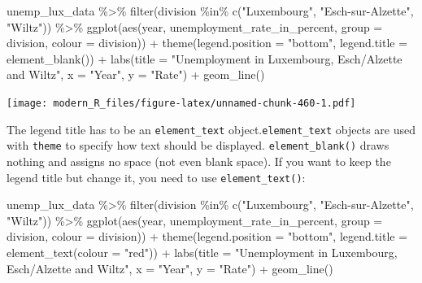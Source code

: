 \documentclass[
]{article}
\newenvironment{Shaded}{\begin{snugshade}}{\end{snugshade}}
\newcommand{\AttributeTok}[1]{\textcolor[rgb]{0.77,0.63,0.00}{#1}}
\newcommand{\FunctionTok}[1]{\textcolor[rgb]{0.00,0.00,0.00}{#1}}
\newcommand{\NormalTok}[1]{#1}
\newcommand{\SpecialCharTok}[1]{\textcolor[rgb]{0.00,0.00,0.00}{#1}}
\newcommand{\StringTok}[1]{\textcolor[rgb]{0.31,0.60,0.02}{#1}}
\begin{document}
\begin{Shaded}
\begin{Highlighting}[]
\NormalTok{unemp\_lux\_data }\SpecialCharTok{\%\textgreater{}\%}
  \FunctionTok{filter}\NormalTok{(division }\SpecialCharTok{\%in\%} \FunctionTok{c}\NormalTok{(}\StringTok{"Luxembourg"}\NormalTok{, }\StringTok{"Esch{-}sur{-}Alzette"}\NormalTok{, }\StringTok{"Wiltz"}\NormalTok{)) }\SpecialCharTok{\%\textgreater{}\%}
  \FunctionTok{ggplot}\NormalTok{(}\FunctionTok{aes}\NormalTok{(year, unemployment\_rate\_in\_percent, }\AttributeTok{group =}\NormalTok{ division, }\AttributeTok{colour =}\NormalTok{ division)) }\SpecialCharTok{+}
  \FunctionTok{theme}\NormalTok{(}\AttributeTok{legend.position =} \StringTok{"bottom"}\NormalTok{, }\AttributeTok{legend.title =} \FunctionTok{element\_blank}\NormalTok{()) }\SpecialCharTok{+}
  \FunctionTok{labs}\NormalTok{(}\AttributeTok{title =} \StringTok{"Unemployment in Luxembourg, Esch/Alzette and Wiltz"}\NormalTok{, }\AttributeTok{x =} \StringTok{"Year"}\NormalTok{, }\AttributeTok{y =} \StringTok{"Rate"}\NormalTok{) }\SpecialCharTok{+}
  \FunctionTok{geom\_line}\NormalTok{()}
\end{Highlighting}
\end{Shaded}

\texttt{[image: modern\_R\_files/figure-latex/unnamed-chunk-460-1.pdf]}

The legend title has to be an \texttt{element\_text} object.\texttt{element\_text} objects are used with \texttt{theme} to
specify how text should be displayed. \texttt{element\_blank()} draws nothing and assigns no space (not
even blank space). If you want to keep the legend title but change it, you need to use \texttt{element\_text()}:

\begin{Shaded}
\begin{Highlighting}[]
\NormalTok{unemp\_lux\_data }\SpecialCharTok{\%\textgreater{}\%}
  \FunctionTok{filter}\NormalTok{(division }\SpecialCharTok{\%in\%} \FunctionTok{c}\NormalTok{(}\StringTok{"Luxembourg"}\NormalTok{, }\StringTok{"Esch{-}sur{-}Alzette"}\NormalTok{, }\StringTok{"Wiltz"}\NormalTok{)) }\SpecialCharTok{\%\textgreater{}\%}
  \FunctionTok{ggplot}\NormalTok{(}\FunctionTok{aes}\NormalTok{(year, unemployment\_rate\_in\_percent, }\AttributeTok{group =}\NormalTok{ division, }\AttributeTok{colour =}\NormalTok{ division)) }\SpecialCharTok{+}
  \FunctionTok{theme}\NormalTok{(}\AttributeTok{legend.position =} \StringTok{"bottom"}\NormalTok{, }\AttributeTok{legend.title =} \FunctionTok{element\_text}\NormalTok{(}\AttributeTok{colour =} \StringTok{"red"}\NormalTok{)) }\SpecialCharTok{+}
  \FunctionTok{labs}\NormalTok{(}\AttributeTok{title =} \StringTok{"Unemployment in Luxembourg, Esch/Alzette and Wiltz"}\NormalTok{, }\AttributeTok{x =} \StringTok{"Year"}\NormalTok{, }\AttributeTok{y =} \StringTok{"Rate"}\NormalTok{) }\SpecialCharTok{+}
  \FunctionTok{geom\_line}\NormalTok{()}
\end{Highlighting}
\end{Shaded}
\end{document}
